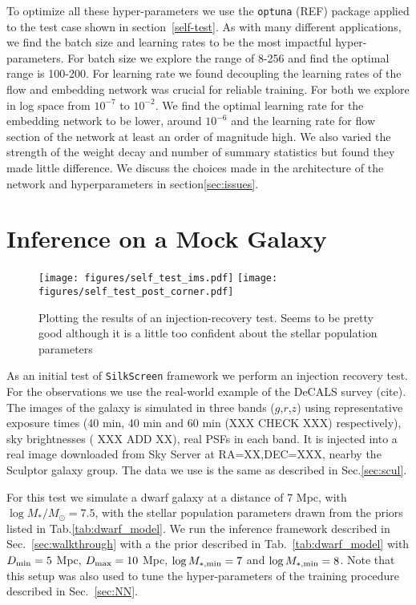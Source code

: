 \documentclass[twocolumn]{aastex631}
\newcommand{\code}[0]{\texttt{SilkScreen}}
\begin{document}
To optimize all these hyper-parameters we use the \texttt{optuna} (REF) package applied to the test case shown in section~\ref{self-test}. As with many different applications, we find the batch size and learning rates to be the most impactful hyper-parameters. For batch size we explore the range of 8-256 and find the optimal range is 100-200. For learning rate we found decoupling the learning rates of the flow and embedding network was crucial for reliable training. For both we explore in log space from $10^{-7}$ to $10^{-2}$. We find the optimal learning rate for the embedding network to be lower, around $10^{-6}$ and the learning rate for flow section of the network at least an order of magnitude high. We also varied the strength of the weight decay and number of summary statistics but found they made little difference. We discuss the choices made in the architecture of the network and hyperparameters in section\ref{sec:issues}.

\section{Inference on a Mock Galaxy}
\label{sec:self-test}
\begin{figure*}
    \centering
    \texttt{[image: figures/self\_test\_ims.pdf]}
    \texttt{[image: figures/self\_test\_post\_corner.pdf]}
    \caption{Plotting the results of an injection-recovery test. Seems to be pretty good although it is a little too confident about the stellar population parameters}
    \label{fig:self_test}
\end{figure*}


As an initial test of \code{} framework we perform an injection recovery test. For the observations we use the real-world example of the DeCALS survey (cite). The images of the galaxy is simulated in three bands ($g$,$r$,$z$) using representative exposure times (40 min, 40 min and 60 min (XXX CHECK XXX) respectively), sky brightnesses ( XXX ADD XX), real PSFs in each band. It is injected into a real image downloaded from Sky Server at RA=XX,DEC=XXX, nearby the Sculptor galaxy group. The data we use is the same as described in Sec.\ref{sec:scul}.

For this test we simulate a dwarf galaxy at a distance of 7 Mpc, with $\log M_*/M_\odot = 7.5$, with the stellar population parameters drawn from the priors listed in Tab.\ref{tab:dwarf_model}. We run the inference framework described in Sec.~\ref{sec:walkthrough} with a the prior described in Tab.~\ref{tab:dwarf_model} with $D_{\rm min} = 5$ Mpc, $D_{\rm max} = 10$ Mpc, $\log M_{*, \rm min} = 7$ and  $\log M_{*, \rm min} = 8$. Note that this setup was also used to tune the hyper-parameters of the training procedure described in Sec.~\ref{sec:NN}.
\end{document}
